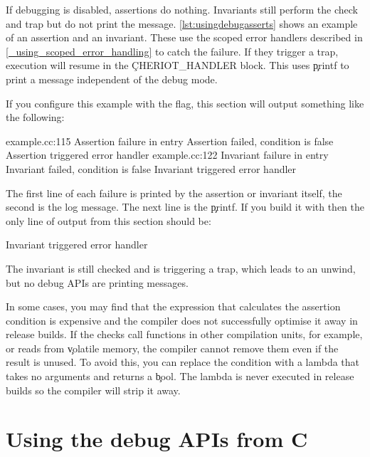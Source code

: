{If debugging is disabled, assertions do nothing.
Invariants still perform the check and trap but do not print the message.
\ref{lst:usingdebugasserts} shows an example of an assertion and an invariant.
These use the scoped error handlers described in \ref{_using_scoped_error_handling} to catch the failure.
If they trigger a trap, execution will resume in the \c{CHERIOT_HANDLER} block.
This uses \c{printf} to print a message independent of the debug mode.

\codelisting[filename=examples/debug_helpers/example.cc,marker=asserts,label=lst:usingdebugasserts,caption="Assertions and invariants with the debugging APIs."]{}

If you configure this example with the  flag, this section will output something like the following:

\begin{console}
example.cc:115 Assertion failure in entry
Assertion failed, condition is false
Assertion triggered error handler
example.cc:122 Invariant failure in entry
Invariant failed, condition is false
Invariant triggered error handler
\end{console}

The first line of each failure is printed by the assertion or invariant itself, the second is the log message.
The next line is the \c{printf}.
If you build it with  then the only line of output from this section should be:

\begin{console}
Invariant triggered error handler
\end{console}

The invariant is still checked and is triggering a trap, which leads to an unwind, but no debug APIs are printing messages.

In some cases, you may find that the expression that calculates the assertion condition is expensive and the compiler does not successfully optimise it away in release builds.
If the checks call functions in other compilation units, for example, or reads from \c{volatile} memory, the compiler cannot remove them even if the result is unused.
To avoid this, you can replace the condition with a lambda that takes no arguments and returns a \c{bool}.
The lambda is never executed in release builds so the compiler will strip it away.

\section{Using the debug APIs from C}

}
